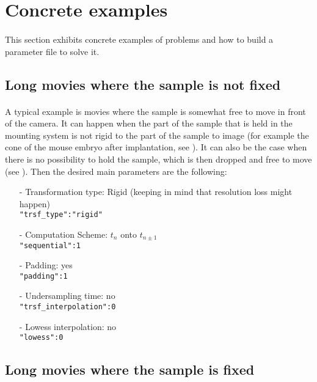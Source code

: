 \documentclass[10pt,a4paper]{book}
\begin{document}
\section{Concrete examples}
\paragraph{}This section exhibits concrete examples of problems and how to build a parameter file to solve it.
\subsection{Long movies where the sample is not fixed}
\paragraph{}A typical example is movies where the sample is somewhat free to move in front of the camera. It can happen when the part of the sample that is held in the mounting system is not rigid to the part of the sample to image (for example the cone of the mouse embryo after implantation, see \citep{McDole:2018aa}). It can also be the case when there is no possibility to hold the sample, which is then dropped and free to move (see \citep{Guignard:2017aa}). Then the desired main parameters are the following:
	\begin{itemize}
		\item[-] Transformation type: Rigid (keeping in mind that resolution loss might happen)\\
					\texttt{"trsf\_type":"rigid"}
		\item[-] Computation Scheme: $t_n$ onto $t_{n\pm 1}$\\
					\texttt{"sequential":1}
		\item[-] Padding: yes\\
					\texttt{"padding":1}
		\item[-] Undersampling time: no\\
					\texttt{"trsf\_interpolation":0}
		\item[-] Lowess interpolation: no\\
					\texttt{"lowess":0}
	\end{itemize}
\subsection{Long movies where the sample is fixed}
\end{document}

